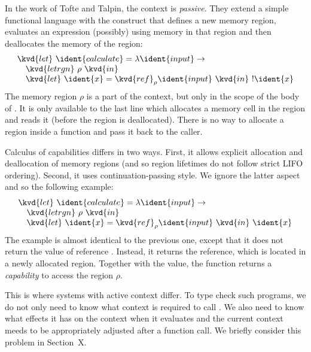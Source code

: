 In the work of Tofte and Talpin, the context is \emph{passive}. They extend a simple functional language
with the  construct that defines a new memory region, evaluates an expression (possibly)
using memory in that region and then deallocates the memory of the region:
%
\begin{equation*}
\begin{array}{l}
\kvd{let}~\ident{calculate} = \lambda \ident{input} \rightarrow\\
\quad\kvd{letrgn}~\rho~\kvd{in}\\
\quad\kvd{let}~\ident{x} = \kvd{ref}_\rho \ident{input}~\kvd{in}~!\ident{x}
\end{array}
\end{equation*}
%
The memory region $\rho$ is a part of the context, but only in the scope of the body of 
. It is only available to the last line which allocates a memory cell in the region
and reads it (before the region is deallocated). There is no way to allocate a region inside a 
function and pass it back to the caller.

Calculus of capabilities differs in two ways. First, it allows explicit allocation and deallocation
of memory regions (and so region lifetimes do not follow strict LIFO ordering). Second, it
uses continuation-passing style. We ignore the latter aspect and so the following example:
%
\begin{equation*}
\begin{array}{l}
\kvd{let}~\ident{calculate} = \lambda \ident{input} \rightarrow\\
\quad \kvd{letrgn}~\rho~\kvd{in}\\
\quad \kvd{let}~\ident{x} = \kvd{ref}_\rho \ident{input}~\kvd{in}~\ident{x}
\end{array}
\end{equation*}
%
The example is almost identical to the previous one, except that it does not return the value
of reference . Instead, it returns the reference, which is located in a newly allocated
region. Together with the value, the function returns a \emph{capability} to access the region
$\rho$.

This is where systems with active context differ. To type check such programs, we do not only need
to know what context is required to call . We also need to know what effects it
has on the context when it evaluates and the current context meeds to be appropriately adjusted
after a function call. We briefly consider this problem in Section~X. %

